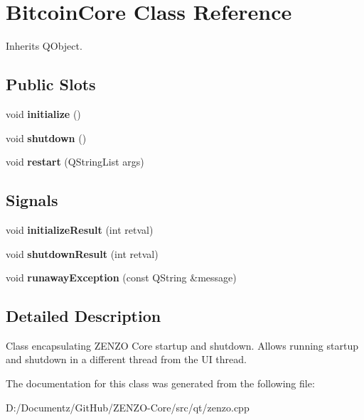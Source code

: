 \hypertarget{class_bitcoin_core}{}\section{Bitcoin\+Core Class Reference}
\label{class_bitcoin_core}


Inherits Q\+Object.

\subsection*{Public Slots}
\begin{DoxyCompactItemize}
\item 
\mbox{\label{class_bitcoin_core_af34ca069cda1d4362dcc109b4397fb62}} 
void {\bfseries initialize} ()
\item 
\mbox{\label{class_bitcoin_core_a94f3f4622ba698e321f3a2e0e686129f}} 
void {\bfseries shutdown} ()
\item 
\mbox{\label{class_bitcoin_core_ac2271844c89ebc4c611e7617ce6202e3}} 
void {\bfseries restart} (Q\+String\+List args)
\end{DoxyCompactItemize}
\subsection*{Signals}
\begin{DoxyCompactItemize}
\item 
\mbox{\label{class_bitcoin_core_a60731c85f462a0fce478334b6f4bad3c}} 
void {\bfseries initialize\+Result} (int retval)
\item 
\mbox{\label{class_bitcoin_core_a42f562bccf2546b161a74be30a879032}} 
void {\bfseries shutdown\+Result} (int retval)
\item 
\mbox{\label{class_bitcoin_core_a72c0e056da09226343525a6a85c54e5a}} 
void {\bfseries runaway\+Exception} (const Q\+String \&message)
\end{DoxyCompactItemize}


\subsection{Detailed Description}
Class encapsulating Z\+E\+N\+ZO Core startup and shutdown. Allows running startup and shutdown in a different thread from the UI thread. 

The documentation for this class was generated from the following file\+:\begin{DoxyCompactItemize}
\item 
D\+:/\+Documentz/\+Git\+Hub/\+Z\+E\+N\+Z\+O-\/\+Core/src/qt/zenzo.\+cpp\end{DoxyCompactItemize}
